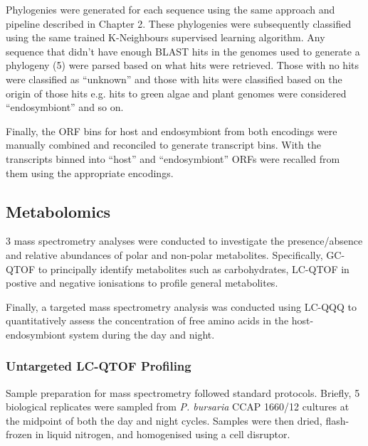 Phylogenies were generated for each sequence using the same approach and pipeline
described in Chapter 2. These phylogenies were subsequently classified using the 
same trained K-Neighbours supervised learning algorithm.
Any sequence that didn't have enough BLAST hits in the genomes used to generate
a phylogeny (5) were parsed based on what hits were retrieved.
Those with no hits were classified as ``unknown'' and those with
hits were classified based on the origin of those hits e.g. hits
to green algae and plant genomes were considered ``endosymbiont'' and so on.

Finally, the ORF bins for host and endosymbiont 
from both encodings were manually combined and reconciled
to generate transcript bins.  With the transcripts binned into
``host'' and ``endosymbiont'' ORFs were recalled from them using the appropriate
encodings. 

\subsection{Metabolomics}

3 mass spectrometry analyses were conducted to investigate the presence/absence
and relative abundances of polar and non-polar metabolites.
Specifically, GC-QTOF to principally identify metabolites such as carbohydrates,
LC-QTOF in postive and negative ionisations to profile general metabolites.

Finally, a targeted mass spectrometry analysis was conducted using
LC-QQQ to quantitatively assess the concentration of free amino acids
in the host-endosymbiont system during the day and night.

\subsubsection{Untargeted LC-QTOF Profiling}

Sample preparation for mass spectrometry followed standard protocols.
Briefly, 5 biological replicates were sampled from \textit{P. bursaria} CCAP 1660/12 
cultures at the midpoint of both the day and night cycles. 
Samples were then dried, flash-frozen in liquid nitrogen, and homogenised
using a cell disruptor. 

